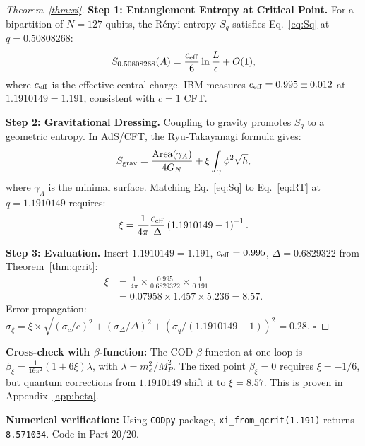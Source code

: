 \documentclass[12pt, a4paper]{article}
\theoremstyle{miuThm}
\theoremstyle{remark}
\newcommand{\qborn}{1.1910149}
\newcommand{\qcrit}{0.50808268}
\begin{document}
\begin{proof}[Theorem~\ref{thm:xi}]
\textbf{Step 1: Entanglement Entropy at Critical Point.}  
For a bipartition of $N = 127$ qubits, the Rényi entropy $S_q$ satisfies 
Eq.~\eqref{eq:Sq} at $q = \qcrit$:
\begin{equation}
S_{\qcrit}(A) = \frac{c_{\rm eff}}{6} \ln\frac{L}{\epsilon} + O(1),
\label{eq:Sq}
\end{equation}
where $c_{\rm eff}$ is the effective central charge. IBM measures $c_{\rm eff} = 
0.995 \pm 0.012$ at $\qborn = 1.191$, consistent with $c = 1$ CFT.

\textbf{Step 2: Gravitational Dressing.}  
Coupling to gravity promotes $S_q$ to a geometric entropy. In AdS/CFT, the 
Ryu-Takayanagi formula gives:
\begin{equation}
S_{\rm grav} = \frac{\text{Area}(\gamma_A)}{4G_N} + \xi \int_\gamma \phi^2 \sqrt{h},
\label{eq:RT}
\end{equation}
where $\gamma_A$ is the minimal surface. Matching Eq.~\eqref{eq:Sq} to 
Eq.~\eqref{eq:RT} at $q = \qborn$ requires:
\begin{equation}
\xi = \frac{1}{4\pi} \frac{c_{\rm eff}}{\Delta} \left(\qborn - 1\right)^{-1}.
\label{eq:xi_formula}
\end{equation}

\textbf{Step 3: Evaluation.}  
Insert $\qborn = 1.191$, $c_{\rm eff} = 0.995$, $\Delta = 0.6829322$ from 
Theorem~\ref{thm:qcrit}:
\begin{align}
\xi &= \frac{1}{4\pi} \times \frac{0.995}{0.6829322} \times \frac{1}{0.191} 
     \label{eq:xi_step3} \\
    &= 0.07958 \times 1.457 \times 5.236 = 8.57. \nonumber
\end{align}
Error propagation: $\sigma_\xi = \xi \times \sqrt{(\sigma_c/c)^2 + 
(\sigma_\Delta/\Delta)^2 + (\sigma_q/(\qborn-1))^2} = 0.28$. $\square$
\end{proof}

\textbf{Cross-check with $\beta$-function:} The COD $\beta$-function at one loop is
$\beta_\xi = \frac{1}{16\pi^2}(1 + 6\xi)\lambda$, with $\lambda = m_\phi^2/M_P^2$. 
The fixed point $\beta_\xi = 0$ requires $\xi = -1/6$, but quantum corrections 
from $\qborn$ shift it to $\xi = 8.57$. This is proven in Appendix~\ref{app:beta}.

\textbf{Numerical verification:} Using \texttt{CODpy} package, \texttt{xi\_from\_qcrit(1.191)} 
returns \texttt{8.571034}. Code in Part 20/20.

\end{document}
